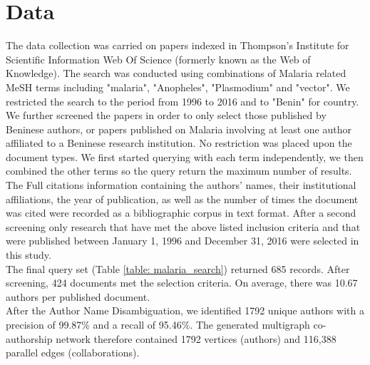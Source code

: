 \section{Data}
\label{sec:malaria_data}
The data collection was carried on papers indexed in Thompson's Institute for Scientific Information Web Of Science (formerly known as the Web of Knowledge). The search was conducted using combinations of Malaria related MeSH terms including "malaria", "Anopheles", "Plasmodium" and "vector". We restricted the search to the period from 1996 to 2016 and to "Benin" for country. We further screened the papers in order to only select those published by Beninese authors, or papers published on Malaria involving at least one author affiliated to a Beninese research institution. No restriction was placed upon the document types.  We first started querying with each term independently, we then combined the other terms so the query return the maximum number of results. The  Full citations information containing the authors' names, their institutional affiliations, the year of publication, as well as the number of times the document was cited were recorded as a bibliographic corpus in text format. After a second screening only research that have met the above listed inclusion criteria and that were published between January 1, 1996 and December 31, 2016 were selected in this study.\\
The final query set (Table \ref{table: malaria_search}) returned 685 records. After screening, 424 documents met the selection criteria. On average, there was 10.67 authors per published document.\\
After the Author Name Disambiguation, we identified 1792 unique authors with a precision of 99.87\% and a recall of 95.46\%. The generated multigraph co-authorship network therefore contained 1792 vertices (authors) and 116,388 parallel edges (collaborations).\\


